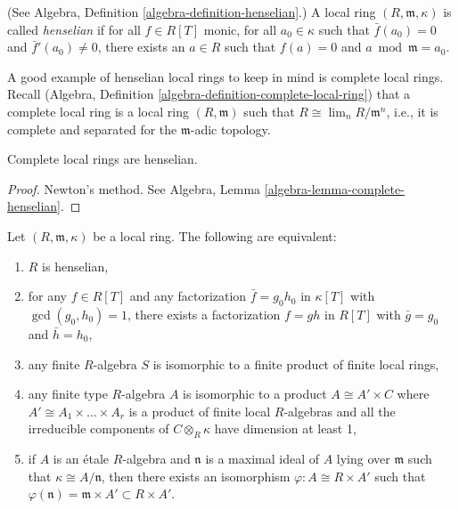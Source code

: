 \begin{definition}
\label{definition-henselian}
(See Algebra, Definition \ref{algebra-definition-henselian}.)
A local ring $(R, \mathfrak m, \kappa)$ is called
{\it henselian} if for all
$f \in R[T]$ monic, for all $a_0 \in \kappa$ such that
$\bar f(a_0) = 0$ and $\bar f'(a_0) \neq 0$, there exists
an $a \in R$ such that $f(a) = 0$ and $a \bmod \mathfrak m = a_0$.
\end{definition}

\noindent
A good example of henselian local rings
to keep in mind is complete local rings.
Recall
(Algebra, Definition \ref{algebra-definition-complete-local-ring})
that a complete local ring is a local ring $(R, \mathfrak m)$ such that
$R \cong \lim_n R/\mathfrak m^n$, i.e., it is complete and separated
for the $\mathfrak m$-adic topology.

\begin{theorem}
\label{theorem-hensel}
Complete local rings are henselian.
\end{theorem}

\begin{proof}
Newton's method. See
Algebra, Lemma \ref{algebra-lemma-complete-henselian}.
\end{proof}

\begin{theorem}
\label{theorem-henselian}
Let $(R, \mathfrak m, \kappa)$ be a local ring. The following are equivalent:
\begin{enumerate}
\item $R$ is henselian,
\item for any $f\in R[T]$ and any factorization $\bar f = g_0 h_0$ in
$\kappa[T]$ with $\gcd(g_0, h_0)=1$, there exists a factorization $f = gh$ in
$R[T]$ with $\bar g = g_0$ and $\bar h = h_0$,
\item any finite $R$-algebra $S$ is isomorphic to a finite product of finite
local rings,
\item any finite type $R$-algebra $A$ is isomorphic to a product
$A \cong A' \times C$ where $A' \cong A_1 \times \ldots \times A_r$
is a product of finite local $R$-algebras and all the irreducible
components of $C \otimes_R \kappa$ have dimension at least 1,
\item if $A$ is an \'etale $R$-algebra and $\mathfrak n$ is a maximal ideal of
$A$ lying over $\mathfrak m$ such that $\kappa \cong A/\mathfrak n$, then there
exists an isomorphism $\varphi : A \cong R \times A'$ such that
$\varphi(\mathfrak n) = \mathfrak m \times A' \subset R \times A'$.
\end{enumerate}
\end{theorem}

